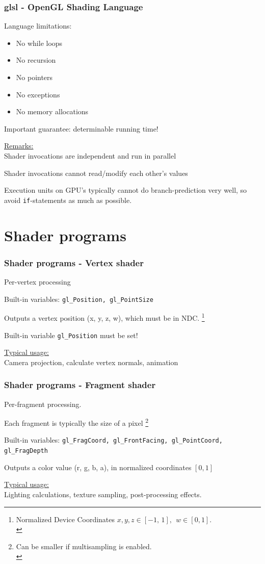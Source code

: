 \documentclass{beamer}
\begin{document}
%
%
%
\begin{frame}
\frametitle{glsl - OpenGL Shading Language}
Language limitations:
\begin{itemize}
\item No while loops
\item No recursion
\item No pointers
\item No exceptions
\item No memory allocations
\end{itemize}
Important guarantee: determinable running time!

\vspace{3mm}\underline{Remarks:}\\\vspace{1mm}
Shader invocations are independent and run in parallel

Shader invocations cannot read/modify each other's values

Execution units on GPU's typically cannot do branch-prediction very well,
so avoid \texttt{if}-statements as much as possible.
\end{frame}


%
%
%
\section{Shader programs}

\begin{frame}
\frametitle{Shader programs - Vertex shader}

Per-vertex processing

Built-in variables: \texttt{gl\_Position, gl\_PointSize}

Outputs a vertex position (x, y, z, w), which must be in NDC.
\footnote{Normalized Device Coordinates $x,y,z \in [-1,\,1],\ \ w \in [0,1]$.\\}

Built-in variable \texttt{gl\_Position} must be set!

\vspace{5mm}
\underline{Typical usage:}\\\vspace{1mm}
Camera projection, calculate vertex normals, animation
\end{frame}


%
%
%
\begin{frame}
\frametitle{Shader programs - Fragment shader}
Per-fragment processing.

Each fragment is typically the size of a pixel
\footnote{Can be smaller if multisampling is enabled.\\}

Built-in variables: \texttt{gl\_FragCoord, gl\_FrontFacing, gl\_PointCoord,
gl\_FragDepth}

Outputs a color value (r, g, b, a), in normalized coordinates $[0, 1]$

\vspace{5mm}
\underline{Typical usage:}\\\vspace{1mm}
Lighting calculations, texture sampling, post-processing effects.
\end{frame}
\end{document}
